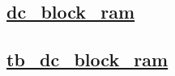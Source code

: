 \documentclass{article}
\begin{document}
  


  \subsection{\href{../files/dc_block_ram-v.html}{dc\_block\_ram}}
  \subsection{\href{../files2/tb_dc_block_ram-v.html}{tb\_dc\_block\_ram}}
\end{document}
